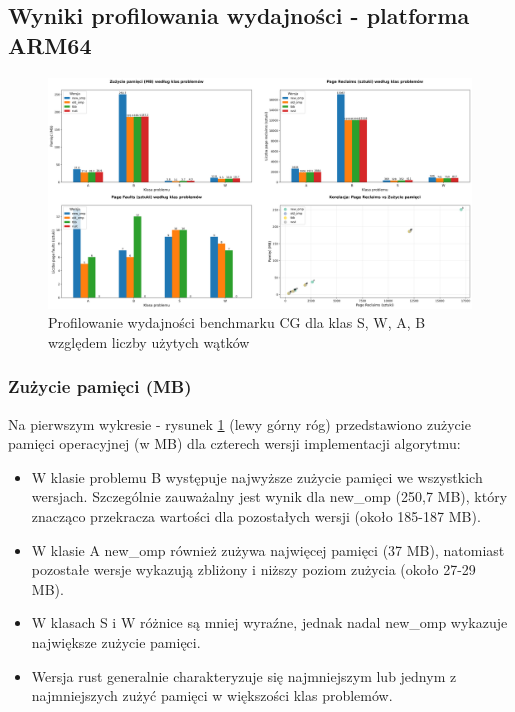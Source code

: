 \subsection{Wyniki profilowania wydajności - platforma ARM64}
\begin{figure}[H]
    \centering
    \includegraphics[width=\textwidth]{analiza/images/parallel/cg/chart_01_memory_comparison.png}
    \caption{Profilowanie wydajności benchmarku CG dla klas S, W, A, B względem liczby użytych wątków}
    \label{cg_porownanie_zuzycia_pamieci}
\end{figure}

\subsubsection{Zużycie pamięci (MB)}
Na pierwszym wykresie - rysunek \ref{cg_porownanie_zuzycia_pamieci} (lewy górny róg) przedstawiono zużycie pamięci operacyjnej (w MB) dla czterech wersji implementacji algorytmu:
\begin{itemize}
    \item W klasie problemu B występuje najwyższe zużycie pamięci we wszystkich wersjach. Szczególnie zauważalny jest wynik dla new\_omp (250,7 MB), który znacząco przekracza wartości dla pozostałych wersji (około 185-187 MB).
    \item W klasie A new\_omp również zużywa najwięcej pamięci (37 MB), natomiast pozostałe wersje wykazują zbliżony i niższy poziom zużycia (około 27-29 MB).
    \item W klasach S i W różnice są mniej wyraźne, jednak nadal new\_omp wykazuje największe zużycie pamięci.
    \item Wersja rust generalnie charakteryzuje się najmniejszym lub jednym z najmniejszych zużyć pamięci w większości klas problemów.
\end{itemize}

